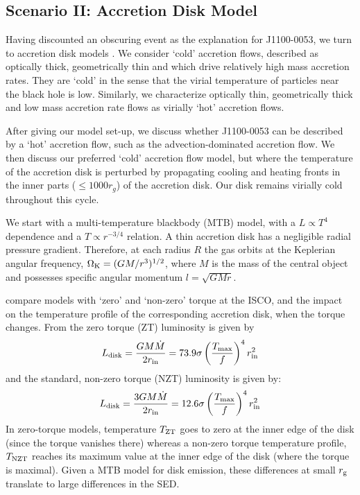 \documentclass[a4paper,fleqn,usenatbib]{mnras}
\begin{document}
\subsection{Scenario II: Accretion Disk Model}
Having discounted an obscuring event as the explanation for
J1100-0053, we turn to accretion disk models \citep[see also the
recent review by ][]{YuanNarayan2014}. We consider `cold' accretion
flows, described as optically thick, geometrically thin and which drive
relatively high mass accretion rates. They are `cold' in the sense
that the virial temperature of particles near the black hole is
low. Similarly, we characterize optically thin, geometrically thick
and low mass accretion rate flows as virially `hot' accretion flows.

After giving our model set-up, we discuss whether J1100-0053 can be
described by a `hot' accretion flow, such as the advection-dominated
accretion flow. We then discuss our preferred `cold' accretion flow
model, but where the temperature of the accretion disk is perturbed by
propagating cooling and heating fronts in the inner parts ($\leq 1000
r_{g}$) of the accretion disk. Our disk remains virially cold
throughout this cycle.
 
We start with a multi-temperature blackbody (MTB) model, with a $L
\propto T^4$ dependence and a $T \propto r^{-3/4}$ relation. A thin
accretion disk has a negligible radial pressure gradient. Therefore,
at each radius $R$ the gas orbits at the Keplerian angular frequency,
$\Omega_{\rm K} = (GM/r^{3})^{1/2}$, where $M$ is the mass of the
central object and possesses specific angular momentum $l= \sqrt{GMr}$. 

\citet{Zimmerman2005} compare models with `zero' and `non-zero' torque
at the ISCO, and the impact on the temperature profile of the
corresponding accretion disk, when the torque changes.  From
\citet{Zimmerman2005} the zero torque (ZT) luminosity is given by
\begin{equation}
L_{\rm disk}   =  \frac{G M \dot{M}}  {2 r_{\rm in}}    = 73.9 \sigma\left ( \frac{T_{\rm max}}{f}  \right )^{4}  r^{2}_{\rm in} 
\end{equation}
and the standard, non-zero torque (NZT) luminosity is given by:
\begin{equation}
L_{\rm disk} = \frac{3 G M \dot{M}}  {2 r_{\rm in}}    = 12.6 \sigma\left ( \frac{T_{\rm max}}{f}  \right )^{4}  r^{2}_{\rm in} 
\end{equation} 
In zero-torque models, temperature $T_{\rm ZT}$ goes to zero at the
inner edge of the disk (since the torque vanishes there) whereas a
non-zero torque temperature profile, $T_{\rm NZT}$ reaches its maximum
value at the inner edge of the disk (where the torque is maximal).
Given a MTB model for disk emission, these differences at small
$r_{\rm g}$ translate to large differences in the SED.
\end{document}
